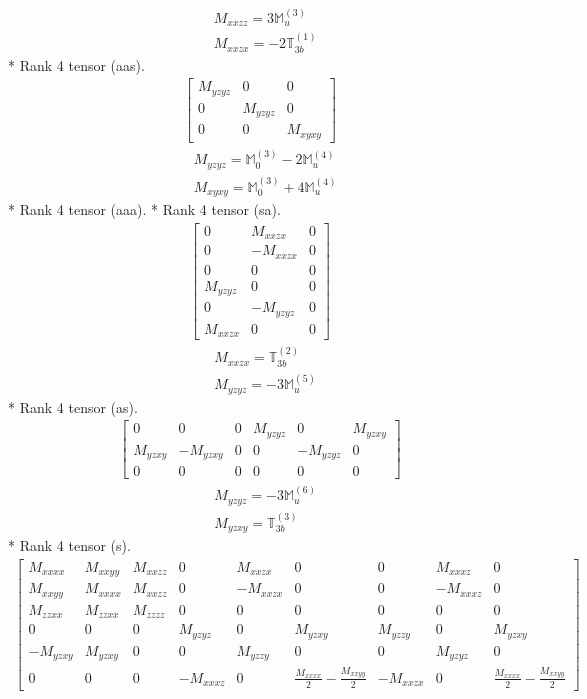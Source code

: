 \documentclass[fleqn,8pt,landscape]{jsarticle}
\begin{document}
\begin{align*}
& M_{xxzz} = 3 \mathbb{M}_{u}^{(3)} \\
& M_{xxzx} = - 2 \mathbb{T}_{3b}^{(1)}
\end{align*}
* Rank 4 tensor (aas).
\begin{align*}
\begin{bmatrix} M_{yzyz} & 0 & 0 \\ 0 & M_{yzyz} & 0 \\ 0 & 0 & M_{xyxy} \end{bmatrix}
\end{align*}
\begin{align*}
& M_{yzyz} = \mathbb{M}_{0}^{(3)} - 2 \mathbb{M}_{u}^{(4)} \\
& M_{xyxy} = \mathbb{M}_{0}^{(3)} + 4 \mathbb{M}_{u}^{(4)}
\end{align*}
* Rank 4 tensor (aaa).
* Rank 4 tensor (sa).
\begin{align*}
\begin{bmatrix} 0 & M_{xxzx} & 0 \\ 0 & - M_{xxzx} & 0 \\ 0 & 0 & 0 \\ M_{yzyz} & 0 & 0 \\ 0 & - M_{yzyz} & 0 \\ M_{xxzx} & 0 & 0 \end{bmatrix}
\end{align*}
\begin{align*}
& M_{xxzx} = \mathbb{T}_{3b}^{(2)} \\
& M_{yzyz} = - 3 \mathbb{M}_{u}^{(5)}
\end{align*}
* Rank 4 tensor (as).
\begin{align*}
\begin{bmatrix} 0 & 0 & 0 & M_{yzyz} & 0 & M_{yzxy} \\ M_{yzxy} & - M_{yzxy} & 0 & 0 & - M_{yzyz} & 0 \\ 0 & 0 & 0 & 0 & 0 & 0 \end{bmatrix}
\end{align*}
\begin{align*}
& M_{yzyz} = - 3 \mathbb{M}_{u}^{(6)} \\
& M_{yzxy} = \mathbb{T}_{3b}^{(3)}
\end{align*}
* Rank 4 tensor (s).
\begin{align*}
\begin{bmatrix} M_{xxxx} & M_{xxyy} & M_{xxzz} & 0 & M_{xxzx} & 0 & 0 & M_{xxxz} & 0 \\ M_{xxyy} & M_{xxxx} & M_{xxzz} & 0 & - M_{xxzx} & 0 & 0 & - M_{xxxz} & 0 \\ M_{zzxx} & M_{zzxx} & M_{zzzz} & 0 & 0 & 0 & 0 & 0 & 0 \\ 0 & 0 & 0 & M_{yzyz} & 0 & M_{yzxy} & M_{yzzy} & 0 & M_{yzxy} \\ - M_{yzxy} & M_{yzxy} & 0 & 0 & M_{yzzy} & 0 & 0 & M_{yzyz} & 0 \\ 0 & 0 & 0 & - M_{xxxz} & 0 & \frac{M_{xxxx}}{2} - \frac{M_{xxyy}}{2} & - M_{xxzx} & 0 & \frac{M_{xxxx}}{2} - \frac{M_{xxyy}}{2} \end{bmatrix}
\end{align*}
\end{document}
